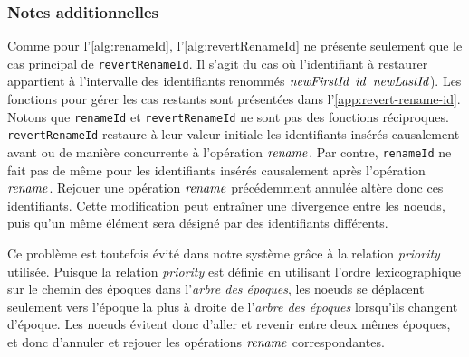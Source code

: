 
\subsubsection{Notes additionnelles}

Comme pour l'\autoref{alg:renameId}, l'\autoref{alg:revertRenameId} ne présente seulement que le cas principal de \texttt{revertRenameId}.
Il s'agit du cas où l'identifiant à restaurer appartient à l'intervalle des identifiants renommés $\mathit{newFirstId}$ \leqid $\mathit{id}$ \leqid $\mathit{newLastId}$).
Les fonctions pour gérer les cas restants sont présentées dans l'\autoref{app:revert-rename-id}.\\

Notons que \texttt{renameId} et \texttt{revertRenameId} ne sont pas des fonctions réciproques.
\texttt{revertRenameId} restaure à leur valeur initiale les identifiants insérés causalement avant ou de manière concurrente à l'opération $\mathit{rename}$.
Par contre, \texttt{renameId} ne fait pas de même pour les identifiants insérés causalement après l'opération $\mathit{rename}$.
Rejouer une opération $\mathit{rename}$ précédemment annulée altère donc ces identifiants.
Cette modification peut entraîner une divergence entre les noeuds, puis qu'un même élément sera désigné par des identifiants différents.

Ce problème est toutefois évité dans notre système grâce à la relation \emph{priority} utilisée.
Puisque la relation \emph{priority} est définie en utilisant l'ordre lexicographique sur le chemin des époques dans l'\emph{arbre des époques}, les noeuds se déplacent seulement vers l'époque la plus à droite de l'\emph{arbre des époques} lorsqu'ils changent d'époque.
Les noeuds évitent donc d'aller et revenir entre deux mêmes époques, et donc d'annuler et rejouer les opérations $\mathit{rename}$ correspondantes.
